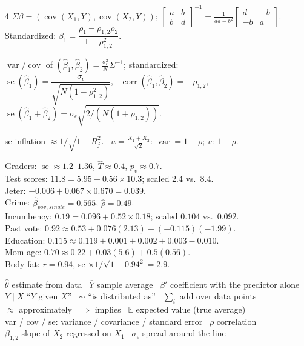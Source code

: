 \documentclass[11pt]{article}
\newcommand{\E}{\mathbb{E}}
\newcommand{\Var}{\operatorname{var}}
\newcommand{\Cov}{\operatorname{cov}}
\newcommand{\corr}{\operatorname{corr}}
\newcommand{\se}{\operatorname{se}}
\newcommand{\given}{\mid}
\newcommand{\Ybar}{\overline{Y}}
\begin{document}
\begin{landscape}
\begin{multicols}{4}
\columnbreak
{}
$\Sigma\beta=(\Cov(X_1,Y),\Cov(X_2,Y))$; $\begin{bmatrix}a&b\\b&d\end{bmatrix}^{-1}=\frac{1}{ad-b^2}\begin{bmatrix}d&-b\\-b&a\end{bmatrix}$.\\
Standardized: $\beta_1=\dfrac{\rho_1-\rho_{1,2}\rho_2}{1-\rho_{1,2}^2}$.
\begin{cbox}
$\Var/\Cov$ of $(\hat\beta_1,\hat\beta_2)=\frac{\sigma_\epsilon^2}{N}\Sigma^{-1}$; standardized:\\
$\se(\hat\beta_1)=\dfrac{\sigma_\epsilon}{\sqrt{N(1-\rho_{1,2}^2)}}$, \ $\corr(\hat\beta_1,\hat\beta_2)=-\rho_{1,2}$,\\
$\se(\hat\beta_1+\hat\beta_2)=\sigma_\epsilon\sqrt{2/(N(1+\rho_{1,2}))}$.
\end{cbox}
se inflation $\approx1/\sqrt{1-R_j^2}$. \ $u=\frac{X_1+X_2}{\sqrt2}$: $\Var=1+\rho$; $v$: $1-\rho$.

Graders: $\se\approx1.2$--$1.36$, $\hat T\approx0.4$, $p_v\approx0.7$.\\
Test scores: $11.8=5.95+0.56\times10.3$; scaled $2.4$ vs.\ $8.4$.\\
Jeter: $-0.006+0.067\times0.670=0.039$.\\
Crime: $\hat\beta_{pov,single}=0.565$, $\hat\rho=0.49$.\\
Incumbency: $0.19=0.096+0.52\times0.18$; scaled $0.104$ vs.\ $0.092$.\\
Past vote: $0.92\approx0.53+0.076(2.13)+(-0.115)(-1.99)$.\\
Education: $0.115\approx0.119+0.001+0.002+0.003-0.010$.\\
Mom age: $0.70\approx0.22+0.03(5.6)+0.5(0.56)$.\\
Body fat: $r=0.94$, se $\times1/\sqrt{1-0.94^2}=2.9$.

$\hat\theta$ estimate from data \ $\Ybar$ sample average \ $\beta'$ coefficient with the predictor alone\\
$Y\given X$ ``$Y$ given $X$'' \ $\sim$ ``is distributed as'' \ $\sum_i$ add over data points\\
$\approx$ approximately \ $\Rightarrow$ implies \ $\E$ expected value (true average)\\
var / cov / se: variance / covariance / standard error \ $\rho$ correlation\\
$\beta_{1,2}$ slope of $X_2$ regressed on $X_1$ \ $\sigma_\epsilon$ spread around the line

\end{multicols}
\endgroup
\end{landscape}
\restoregeometry
\end{document}
